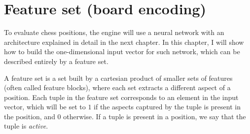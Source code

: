 \newcommand{\white}{\fullmoon}
\newcommand{\black}{\newmoon}

\newcommand{\bigtimes}{\mathop{\raisebox{-0.5ex}{\scalebox{2}{$\times$}}}}

\newcommand{\pieceBoard}{
    \newcount\pieceindex
    \setcounter{pieceindex}{0}
    \raisebox{-7ex}{
        \centering
        \chessboard[
            tinyboard,
            showmover=false,
            margin=false,
            padding=false,
            hlabel=false,
            vlabel=false,
            pgfstyle={text},
            text=\fontsize{1.2ex}{1.2ex}\bfseries\sffamily \currentwq,
            markboard
        ]
    }
}
\newcommand{\pieceRolesTable}{
    \begin{tabular}{|l|}
        \hline
        \sympawn\ Pawn \\
        \hline
        \symknight\ Knight \\
        \hline
        \symbishop\ Bishop \\
        \hline
        \symrook\ Rook \\
        \hline
        \symqueen\ Queen \\
        \hline
        \symking\ King \\
        \hline
    \end{tabular}
}
\newcommand{\pieceColorsTable}{
    \begin{tabular}{|l|}
        \hline
        $\white$ White \\
        \hline
        $\black$ Black \\
        \hline
    \end{tabular}
}

\newcommand{\featureset}[1]{\textsc{#1}}


\section{Feature set (board encoding)}

To evaluate chess positions, the engine will use a neural network with an architecture explained in detail in the next chapter. In this chapter, I will show how to build the one-dimensional input vector for such network, which can be described entirely by a feature set.

A feature set is a set built by a cartesian product of smaller sets of features (often called feature blocks), where each set extracts a different aspect of a position. Each tuple in the feature set corresponds to an element in the input vector, which will be set to $1$ if the aspects captured by the tuple is present in the position, and $0$ otherwise. If a tuple is present in a position, we say that the tuple is \textit{active}.

